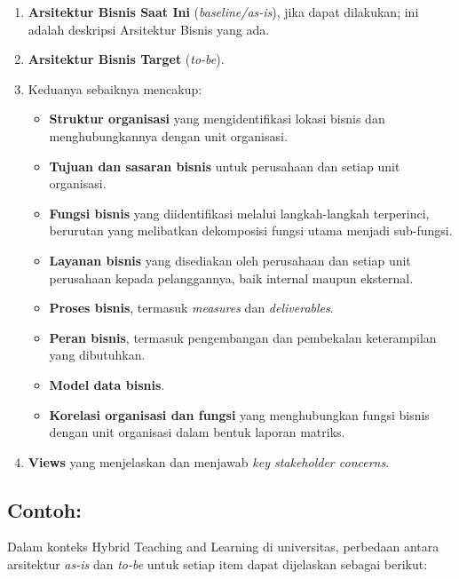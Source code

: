 \begin{enumerate}
	\item \textbf{Arsitektur Bisnis Saat Ini} (\textit{baseline/as-is}), jika dapat dilakukan; ini adalah deskripsi Arsitektur Bisnis yang ada.
	\item \textbf{Arsitektur Bisnis Target} (\textit{to-be}).
	\item Keduanya sebaiknya mencakup:
	\begin{itemize}
		\item \textbf{Struktur organisasi} yang mengidentifikasi lokasi bisnis dan menghubungkannya dengan unit organisasi.
		\item \textbf{Tujuan dan sasaran bisnis} untuk perusahaan dan setiap unit organisasi.
		\item \textbf{Fungsi bisnis} yang diidentifikasi melalui langkah-langkah terperinci, berurutan yang melibatkan dekomposisi fungsi utama menjadi sub-fungsi.
		\item \textbf{Layanan bisnis} yang disediakan oleh perusahaan dan setiap unit perusahaan kepada pelanggannya, baik internal maupun eksternal.
		
		\item \textbf{Proses bisnis}, termasuk \textit{measures} dan \textit{deliverables}.
		\item \textbf{Peran bisnis}, termasuk pengembangan dan pembekalan keterampilan yang dibutuhkan.
		\item \textbf{Model data bisnis}.
		\item \textbf{Korelasi organisasi dan fungsi} yang menghubungkan fungsi bisnis dengan unit organisasi dalam bentuk laporan matriks.
	\end{itemize}
	\item \textbf{Views} yang menjelaskan dan menjawab \textit{key stakeholder concerns}. 
\end{enumerate}

\subsection{Contoh:}

Dalam konteks Hybrid Teaching and Learning di universitas, perbedaan antara arsitektur \textit{as-is} dan \textit{to-be} untuk setiap item dapat dijelaskan sebagai berikut:

